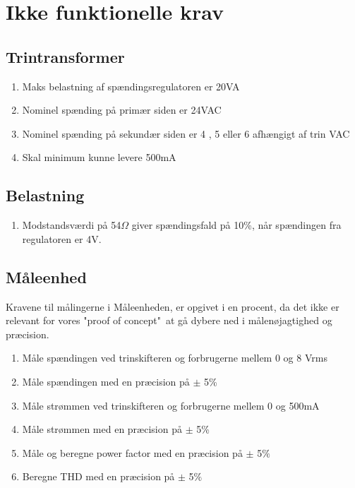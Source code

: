 
\section{Ikke funktionelle krav}

\subsection{Trintransformer}
\begin{enumerate}
	\item Maks belastning af spændingsregulatoren er 20VA
	\item Nominel spænding på primær siden er 24VAC
	\item Nominel spænding på sekundær siden er 4 , 5 eller 6 afhængigt af trin VAC
	\item Skal minimum kunne levere 500mA	
\end{enumerate}

\subsection{Belastning}
\begin{enumerate}
	\item Modstandsværdi på 54$\Omega$ giver spændingsfald på 10\%, når spændingen fra regulatoren er 4V.
\end{enumerate}

\subsection{Måleenhed}
\label{subsec:ME}
Kravene til målingerne i Måleenheden, er opgivet i en procent, da det ikke er relevant for vores "proof of concept"\  at gå dybere ned i målenøjagtighed og præcision. 
\begin{enumerate}
	\item Måle spændingen ved trinskifteren og forbrugerne mellem 0 og 8 Vrms
	\item Måle spændingen med en præcision på $\pm$ 5\%
	\item Måle strømmen ved trinskifteren og forbrugerne mellem 0 og 500mA
	\item Måle strømmen med en præcision på $\pm$ 5\%
	\item Måle og beregne power factor med en præcision på $\pm$ 5$\%$
	\item Beregne THD med en præcision på $\pm$ 5$\%$
\end{enumerate}


